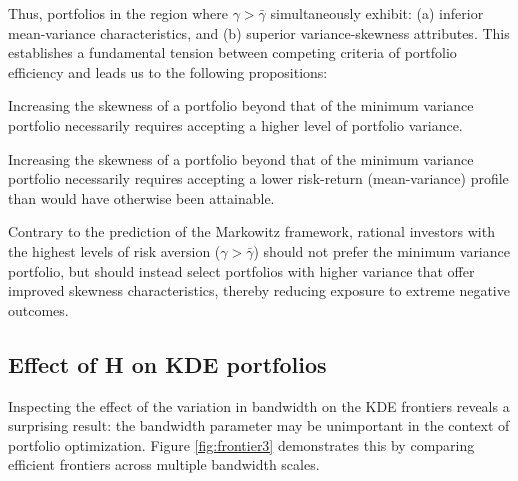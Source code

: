 Thus, portfolios in the region where $\gamma > \bar{\gamma}$ simultaneously exhibit: (a) inferior mean-variance characteristics, and (b) superior variance-skewness attributes. This establishes a fundamental tension between competing criteria of portfolio efficiency and leads us to the following propositions:

\begin{proposition}\label{prop:skew-var}
Increasing the skewness of a portfolio beyond that of the minimum variance portfolio necessarily requires accepting a higher level of portfolio variance.
\end{proposition}

\begin{proposition}\label{prop:skew-sharpe}
Increasing the skewness of a portfolio beyond that of the minimum variance portfolio necessarily requires accepting a lower risk-return (mean-variance) profile than would have otherwise been attainable.
\end{proposition}

\begin{proposition}\label{prop:counterpoint}
Contrary to the prediction of the Markowitz framework, rational investors with the highest levels of risk aversion ($\gamma > \bar{\gamma}$) should not prefer the minimum variance portfolio, but should instead select portfolios with higher variance that offer improved skewness characteristics, thereby reducing exposure to extreme negative outcomes.
\end{proposition}

\subsection{Effect of H on KDE portfolios}
\label{sec:honkde}
Inspecting the effect of the variation in bandwidth on the KDE frontiers reveals a surprising result: the bandwidth parameter may be unimportant in the context of portfolio optimization. Figure \ref{fig:frontier3} demonstrates this by comparing efficient frontiers across multiple bandwidth scales.

